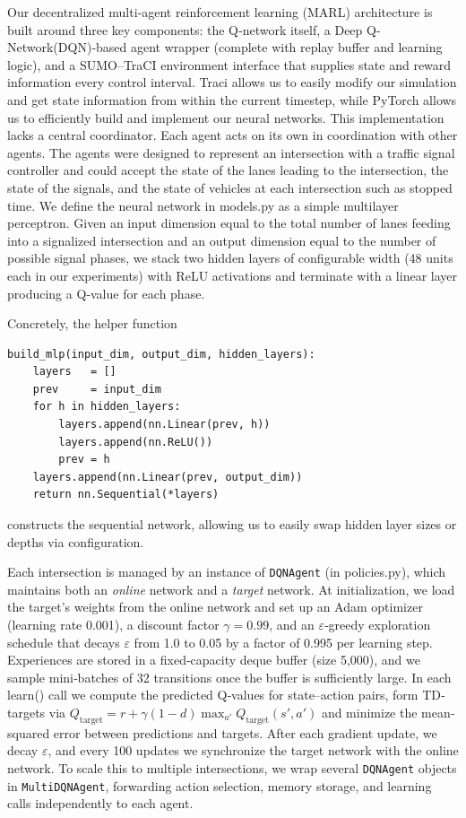 \documentclass[conference]{IEEEtran}
\begin{document}
Our decentralized multi‐agent reinforcement learning (MARL) architecture is built around three key components: the Q‐network itself, a Deep Q-Network(DQN)‐based agent wrapper (complete with replay buffer and learning logic), and a SUMO–TraCI environment interface that supplies state and reward information every control interval. Traci allows us to easily modify our simulation and get state information from within the current timestep, while PyTorch allows us to efficiently build and implement our neural networks. This implementation lacks a central coordinator. Each agent acts on its own in coordination with other agents. The agents were designed to represent an intersection with a traffic signal controller and could accept the state of the lanes leading to the intersection, the state of the signals, and the state of vehicles at each intersection such as stopped time. We define the neural network in models.py as a simple multilayer perceptron. Given an input dimension equal to the total number of lanes feeding into a signalized intersection and an output dimension equal to the number of possible signal phases, we stack two hidden layers of configurable width (48 units each in our experiments) with ReLU activations and terminate with a linear layer producing a Q‐value for each phase. 

Concretely, the helper function
\begin{verbatim}
build_mlp(input_dim, output_dim, hidden_layers):
    layers   = []
    prev     = input_dim
    for h in hidden_layers:
        layers.append(nn.Linear(prev, h))
        layers.append(nn.ReLU())
        prev = h
    layers.append(nn.Linear(prev, output_dim))
    return nn.Sequential(*layers)
\end{verbatim}
constructs the sequential network, allowing us to easily swap hidden layer sizes or depths via configuration.

Each intersection is managed by an instance of {\tt DQNAgent} (in policies.py), which maintains both an \emph{online} network and a \emph{target} network. At initialization, we load the target’s weights from the online network and set up an Adam optimizer (learning rate 0.001), a discount factor $\gamma=0.99$, and an $\varepsilon$‐greedy exploration schedule that decays $\varepsilon$ from 1.0 to 0.05 by a factor of 0.995 per learning step. Experiences are stored in a fixed‐capacity deque buffer (size 5,000), and we sample mini‐batches of 32 transitions once the buffer is sufficiently large. In each learn() call we compute the predicted Q‐values for state–action pairs, form TD‐targets via \(Q_{\mathrm{target}} = r + \gamma (1 - d)\max_{a'} Q_{\mathrm{target}}(s', a')\) and minimize the mean‐squared error between predictions and targets. After each gradient update, we decay $\varepsilon$, and every 100 updates we synchronize the target network with the online network. To scale this to multiple intersections, we wrap several {\tt DQNAgent} objects in {\tt MultiDQNAgent}, forwarding action selection, memory storage, and learning calls independently to each agent.
\end{document}
